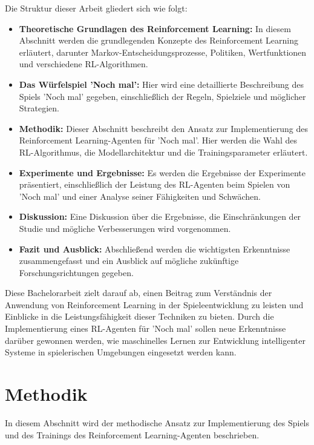 Die Struktur dieser Arbeit gliedert sich wie folgt:
\begin{itemize}

    \item \textbf{Theoretische Grundlagen des Reinforcement Learning:} In diesem Abschnitt werden die grundlegenden Konzepte des Reinforcement Learning erläutert, darunter Markov-Entscheidungsprozesse, Politiken, Wertfunktionen und verschiedene RL-Algorithmen.
    \item \textbf{Das Würfelspiel 'Noch mal':} Hier wird eine detaillierte Beschreibung des Spiels 'Noch mal' gegeben, einschließlich der Regeln, Spielziele und möglicher Strategien.
    \item \textbf{Methodik:} Dieser Abschnitt beschreibt den Ansatz zur Implementierung des Reinforcement Learning-Agenten für 'Noch mal'. Hier werden die Wahl des RL-Algorithmus, die Modellarchitektur und die Trainingsparameter erläutert.
    \item \textbf{Experimente und Ergebnisse:} Es werden die Ergebnisse der Experimente präsentiert, einschließlich der Leistung des RL-Agenten beim Spielen von 'Noch mal' und einer Analyse seiner Fähigkeiten und Schwächen.
    \item \textbf{Diskussion:} Eine Diskussion über die Ergebnisse, die Einschränkungen der Studie und mögliche Verbesserungen wird vorgenommen.
    \item \textbf{Fazit und Ausblick:} Abschließend werden die wichtigsten Erkenntnisse zusammengefasst und ein Ausblick auf mögliche zukünftige Forschungsrichtungen gegeben.
\end{itemize}

Diese Bachelorarbeit zielt darauf ab, einen Beitrag zum Verständnis der Anwendung von Reinforcement Learning in der Spieleentwicklung zu leisten und Einblicke in die Leistungsfähigkeit dieser Techniken zu bieten. Durch die Implementierung eines RL-Agenten für 'Noch mal' sollen neue Erkenntnisse darüber gewonnen werden, wie maschinelles Lernen zur Entwicklung intelligenter Systeme in spielerischen Umgebungen eingesetzt werden kann.


\newpage

\section{Methodik}

In diesem Abschnitt wird der methodische Ansatz zur Implementierung des Spiels und des Trainings des Reinforcement Learning-Agenten beschrieben.


